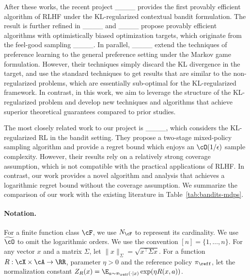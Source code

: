After these works, the recent project ____ provides the first provably efficient algorithm of RLHF under the KL-regularized contextual bandit formulation. The result is further refined in ____ and ____ propose provably efficient algorithms with optimistically biased optimization targets, which originate from the feel-good sampling ____. In parallel, ____ extend the techniques of preference learning to the general preference setting under the Markov game formulation. However, their techniques simply discard the KL divergence in the target, and use the standard techniques to get results that are similar to the non-regularized problems, which are essentially sub-optimal for the KL-regularized framework. In contrast, in this work, we aim to leverage the structure of the KL-regularized problem and develop new techniques and algorithms that achieve superior theoretical guarantees compared to prior studies.

The most closely related work to our project is ____, which considers the KL-regularized RL in the bandit setting. They propose a two-stage mixed-policy sampling algorithm and provide a regret bound which enjoys an $\cO(1 / \epsilon)$ sample complexity. However, their results rely on a relatively strong coverage assumption, which is not compatible with the practical applications of RLHF. In contrast, our work provides a novel algorithm and analysis that achieves a logarithmic regret bound without the coverage assumption. We summarize the comparison of our work with the existing literature in Table~\ref{tab:bandits-mdps}.

\paragraph{Notation.} For a finite function class $\cF$, we use $N_\cF$ to represent its cardinality. We use $\widetilde{\cO}$ to omit the logarithmic orders. We use the convention $[n]=\{1,\ldots,n\}$. For any vector $x$ and a matrix $\Sigma$, let $\|x\|_\Sigma=\sqrt{x^{\top}\Sigma x}$. For a function $R:\cX\times\cA\rightarrow\RR$, parameter $\eta>0$ and the reference policy $\pi_{\reff}$, let the normalization constant $Z_R(x)=\E_{a \sim \pi_{\reff}(\cdot|x)} \exp (\eta R(x,a))$.